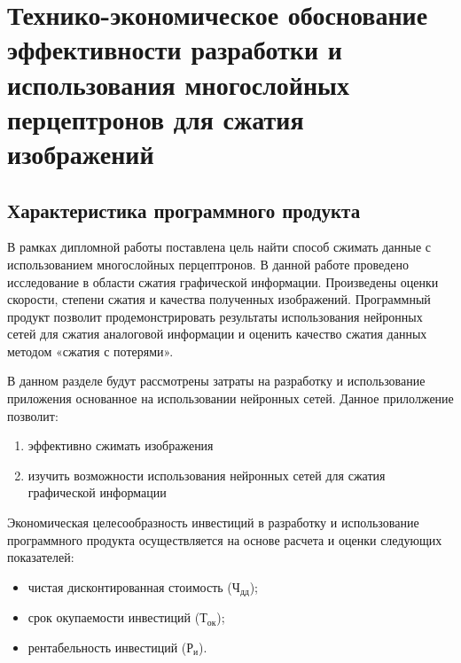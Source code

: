 \newcommand{\byr}{Br}

\chapter{Технико-экономическое обоснование эффективности разработки и использования многослойных перцептронов для сжатия изображений}

\section{Характеристика программного продукта}

В рамках дипломной работы поставлена цель найти способ сжимать данные с использованием многослойных перцептронов. В данной работе проведено исследование в области сжатия графической информации. Произведены оценки скорости, степени сжатия и качества полученных изображений. Программный продукт позволит продемонстрировать результаты использования нейронных сетей для сжатия аналоговой информации и оценить качество сжатия данных методом «сжатия с потерями».

В данном разделе будут рассмотрены затраты на разработку и использование приложения основанное на использовании нейронных сетей. Данное прилолжение позволит:
\begin{enumerate}

  \item эффективно сжимать изображения

  \item изучить возможности использования нейронных сетей для сжатия графической информации

\end{enumerate}

Экономическая целесообразность инвестиций в разработку и использование программного продукта осуществляется на основе расчета и оценки следующих показателей:

\begin{itemize}

  \item чистая  дисконтированная стоимость ($ \text{Ч}_\text{дд} $);
  
  \item срок окупаемости инвестиций ($ \text{Т}_\text{ок} $);
  
  \item рентабельность инвестиций ($ \text{Р}_\text{и} $).
  
\end{itemize}

